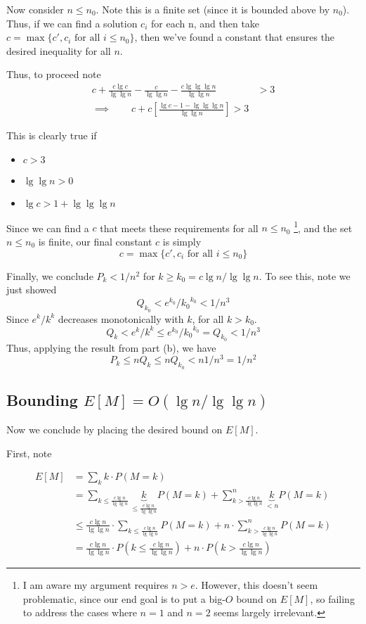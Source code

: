 \documentclass[paper=a4, fontsize=11pt]{scrartcl} %
\numberwithin{equation}{section} %
\numberwithin{figure}{section} %
\numberwithin{table}{section} %
\begin{document}
Now consider $n \leq n_0$. Note this is a finite set (since it is bounded above by $n_0$). Thus, if we can find a solution $c_i$ for each n, and then take $c = \max\{c', c_i \textrm{ for all } i \leq n_0\}$, then we've found a constant that ensures the desired inequality for all $n$.

Thus, to proceed note 
\begin{align*}
c + \frac{c \lg c}{\lg \lg n}  - \frac{c}{\lg \lg n} - \frac{c  \lg \lg \lg n}{\lg \lg n} &> 3 \\
\implies{} \qquad{} c + c \left[\frac{\lg c - 1 - \lg \lg \lg n}{\lg \lg n}\right] > 3
\end{align*}

This is clearly true if
\begin{itemize}
\item $c > 3$
\item $\lg \lg n > 0$
\item $\lg c > 1 + \lg \lg \lg n$
\end{itemize}

Since we can find a $c$ that meets these requirements for all $n \leq n_0$ \footnote{I am aware my argument requires $n > e$. However, this doesn't seem problematic, since our end goal is to put a big-$O$ bound on $E[M]$, so failing to address the cases where $n = 1$ and $n = 2$ seems largely irrelevant.}, and the set $n \leq n_0$ is finite, our final constant $c$ is simply
\[c = \max\{c', c_i \textrm{ for all } i \leq n_0\}\]

Finally, we conclude $P_k < 1/n^2$ for $k \geq k_0 = c \lg n / \lg \lg n$. To see this, note we just showed
\[Q_{k_0} < e^{k_0}/{k_0}^{k_0} < 1/n^3 \]
Since $e^{k}/{k}^{k}$ decreases monotonically with $k$, for all $k > k_0$.
\[Q_{k} < e^{k}/{k}^{k} \leq e^{k_0}/{k_0}^{k_0} = Q_{k_0} < 1/n^3 \]
Thus, applying the result from part (b), we have
\[P_k \leq n Q_k \leq n Q_{k_0} < n 1/n^3 = 1/n^2\]

\subsection{Bounding $E[M] = O(\lg n / \lg \lg n)$}

Now we conclude by placing the desired bound on $E[M]$.

First, note 

\begin{align*}
E[M] &= \sum_k k\cdot P(M = k) \\
	&= \sum_{k \leq \frac{c \lg n}{\lg \lg n}} \underbrace{k}_{\leq \frac{c \lg n}{\lg \lg n}} P(M = k) + \sum_{k > \frac{c \lg n}{\lg \lg n}}^n \underbrace{k}_{< n} P(M = k) \\
	&\leq \frac{c \lg n}{\lg \lg n} \cdot \sum_{k \leq \frac{c \lg n}{\lg \lg n}} P(M = k) + n \cdot \sum_{k > \frac{c \lg n}{\lg \lg n}}^n P(M = k) \\
	&=  \frac{c \lg n}{\lg \lg n} \cdot P\left(k \leq \frac{c \lg n}{\lg \lg n}\right) + n \cdot P\left(k > \frac{c \lg n}{\lg \lg n}\right)
\end{align*}
\end{document}
